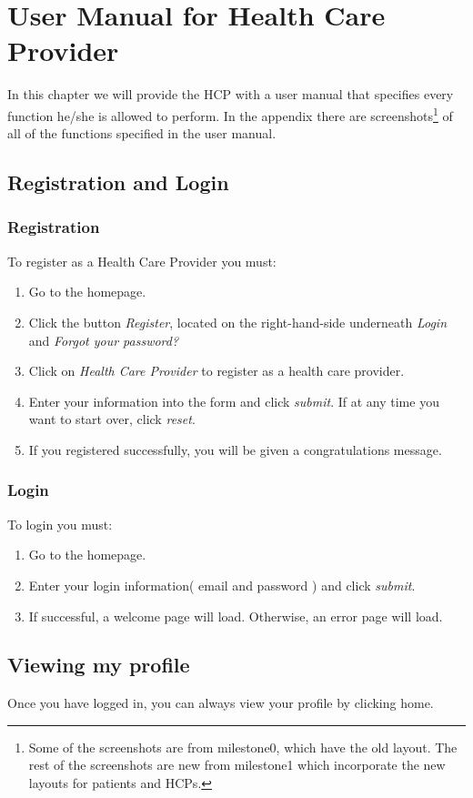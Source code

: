 
\chapter{User Manual for Health Care Provider}

In this chapter we will provide the HCP with a user manual that specifies every function he/she is allowed to perform.  In the appendix there are screenshots\footnote{Some of the screenshots are from milestone0, which have the old layout. The rest of the screenshots are new from milestone1 which incorporate the new layouts for patients and HCPs.} of all of the functions specified in the user manual.


\section{Registration and Login}
\subsection{Registration}
To register as a Health Care Provider you must:
\begin{enumerate}
\item Go to the homepage.
\item Click the button \textit{Register}, located on the right-hand-side underneath \textit{Login} and \textit{Forgot your password?}
\item Click on \textit{Health Care Provider} to register as a health care provider.
\item Enter your information into the form and click \textit{submit}. If at any time you want to start over, click \textit{reset}.
\item If you registered successfully, you will be given a congratulations message.
\end{enumerate}
\subsection{Login}
To login you must:
\begin{enumerate}
\item Go to the homepage.
\item Enter your login information( email and password ) and click \textit{submit}.
\item If successful, a welcome page will load. Otherwise, an error page will load. 
\end{enumerate}

\section{Viewing my profile}
Once you have logged in, you can always view your profile by clicking home.

